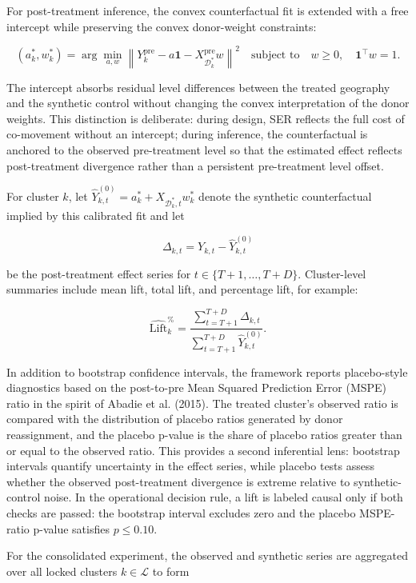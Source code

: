 \documentclass[11pt]{article}
\begin{document}
For post-treatment inference, the convex counterfactual fit is extended with a free intercept while preserving the convex donor-weight constraints:

\[
(a_k^*, w_k^*) = \arg\min_{a,w} \left\| Y_k^{\mathrm{pre}} - a\mathbf{1} - X_{\mathcal{D}_k^*}^{\mathrm{pre}} w \right\|^2
\quad \text{subject to} \quad w \geq 0, \quad \mathbf{1}^\top w = 1.
\]

The intercept absorbs residual level differences between the treated geography and the synthetic control without changing the convex interpretation of the donor weights. This distinction is deliberate: during design, SER reflects the full cost of co-movement without an intercept; during inference, the counterfactual is anchored to the observed pre-treatment level so that the estimated effect reflects post-treatment divergence rather than a persistent pre-treatment level offset.

For cluster $k$, let $\hat{Y}_{k,t}^{(0)} = a_k^* + X_{\mathcal{D}_k^*,t} w_k^*$ denote the synthetic counterfactual implied by this calibrated fit and let

\[
\Delta_{k,t} = Y_{k,t} - \hat{Y}_{k,t}^{(0)}
\]

be the post-treatment effect series for $t \in \{T+1, \ldots, T+D\}$. Cluster-level summaries include mean lift, total lift, and percentage lift, for example:

\[
\widehat{\mathrm{Lift}}_k^{\%} = \frac{\sum_{t=T+1}^{T+D} \Delta_{k,t}}{\sum_{t=T+1}^{T+D} \hat{Y}_{k,t}^{(0)}}.
\]

In addition to bootstrap confidence intervals, the framework reports placebo-style diagnostics based on the post-to-pre Mean Squared Prediction Error (MSPE) ratio in the spirit of Abadie et al. (2015). The treated cluster's observed ratio is compared with the distribution of placebo ratios generated by donor reassignment, and the placebo p-value is the share of placebo ratios greater than or equal to the observed ratio. This provides a second inferential lens: bootstrap intervals quantify uncertainty in the effect series, while placebo tests assess whether the observed post-treatment divergence is extreme relative to synthetic-control noise. In the operational decision rule, a lift is labeled causal only if both checks are passed: the bootstrap interval excludes zero and the placebo MSPE-ratio p-value satisfies $p \leq 0.10$.

For the consolidated experiment, the observed and synthetic series are aggregated over all locked clusters $k \in \mathcal{L}$ to form
\end{document}

